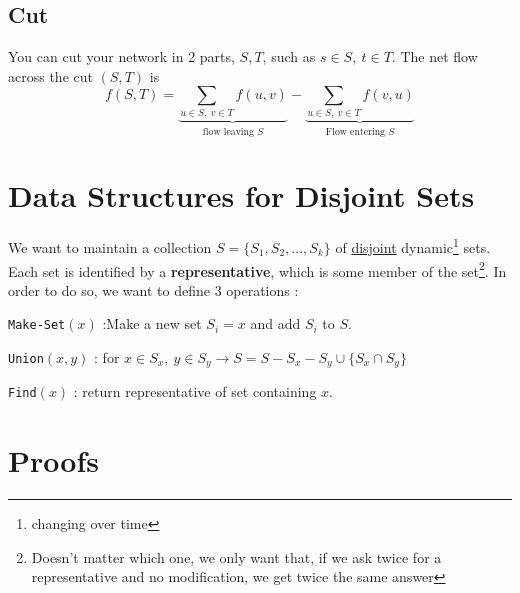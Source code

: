 \documentclass[12pt,twoside,a4paper]{article}
\begin{document}
\subsection{Cut}
You can cut your network in 2 parts, $S,T$, such as $s\in S,\ t\in T$. The net flow across the cut $(S,T)$ is 
\begin{equation}
	f(S,T) = \underbrace{\sum_{u\in S,\ v\in T} f(u,v)}_{\text{flow leaving }S} - \underbrace{\sum_{u\in S,\ v\in T} f(v,u)}_{\text{Flow entering }S}
\end{equation}


\section{Data Structures for Disjoint Sets}
We want to maintain a collection $S = \{S_1,S_2,...,S_k\}$ of \uline{disjoint} dynamic\footnote{changing over time} sets. Each set is identified by a \textbf{representative}, which is some member of the set\footnote{Doesn't matter which one, we only want that, if we ask twice for a representative and no modification, we get twice the same answer}. In order to do so, we want to define 3 operations :

\texttt{Make-Set}$(x)$ :Make a new set $S_i = {x}$ and add $S_i$ to $S$.

\texttt{Union}$(x,y)$ : for $x \in S_x,\ y \in S_y \to S = S- S_x - S_y \cup \{S_x \cap S_y\}$

\texttt{Find}$(x)$ : return representative of set containing $x$.


\newpage
\appendix
\section{Proofs} \label{appendix: proofs}
\end{document}
